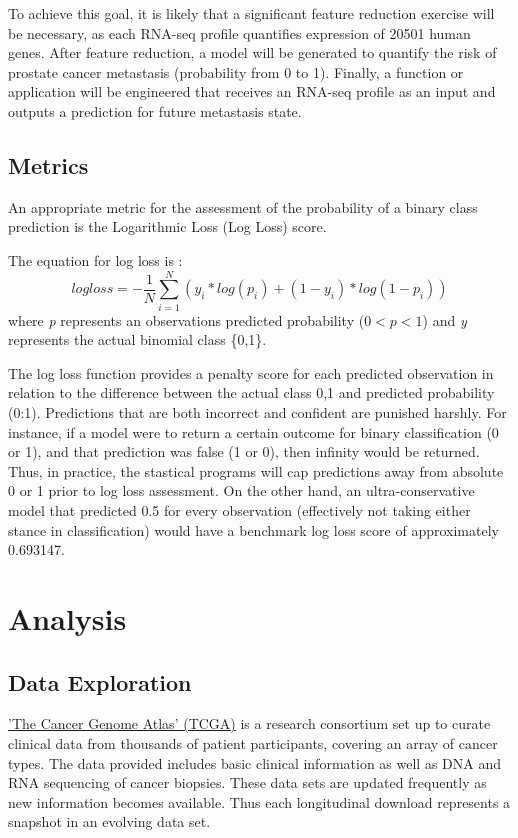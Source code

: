 \documentclass[final]{article}
\begin{document}
To achieve this goal, it is likely that a  significant feature reduction
exercise will be necessary, as each  RNA-seq profile quantifies expression of
20501 human genes.  After feature reduction, a model will be generated to
quantify the risk of prostate cancer metastasis (probability from 0 to 1).
Finally, a function or application will be engineered that receives an RNA-seq
profile as an input and outputs a prediction for future metastasis state.

\subsection{Metrics}

An appropriate metric for the assessment of the probability of a binary class prediction is the
Logarithmic Loss (Log Loss) score.

The equation for log loss is : $$ logloss = -\frac{1}{N} \sum_{i=1}^{N} (y_i
*log(p_i) + (1- y_i) * log(1-p_i)) $$ where \textit{p} represents an observations
predicted probability ($0 < \textit{p} < 1$) and \textit{y} represents the actual binomial class
\{0,1\}.

The log loss function provides a penalty score for each predicted observation in
relation to the difference between the actual class {0,1} and predicted
probability (0:1).  Predictions that are both incorrect and confident are
punished harshly.  For instance, if a model were to return a certain outcome for
binary classification (0 or 1), and that prediction was false (1 or 0), then
infinity would be returned. Thus, in practice, the stastical programs will cap
predictions away from  absolute 0 or 1 prior to log loss assessment.  On the
other hand, an ultra-conservative model that predicted 0.5 for every observation
(effectively not taking either stance in classification) would have a benchmark
log loss score of approximately 0.693147.


\section{Analysis}

\subsection{Data Exploration}

\href{www.http://cancergenome.nih.gov/}{'The Cancer Genome Atlas' (TCGA)} is a
research consortium set up to curate clinical data from thousands of patient
participants, covering an array of cancer types.   The data provided includes basic
clinical information as well as DNA and RNA sequencing of cancer biopsies. These
data sets are updated frequently as new information becomes available.  Thus
each longitudinal download represents a snapshot in an evolving data set.
\end{document}
